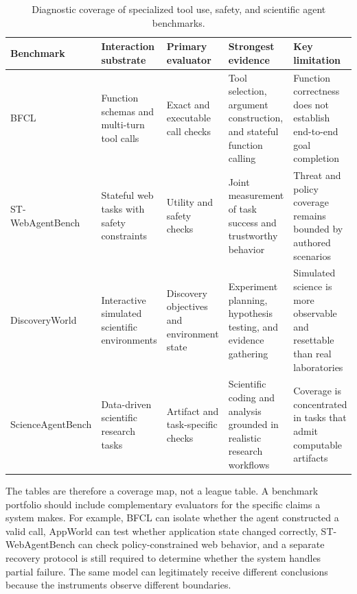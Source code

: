 \begin{table}[!htbp]
\centering
\caption{Diagnostic coverage of specialized tool use, safety, and scientific agent benchmarks.}
\label{tab:benchmark-evidence-specialized}
\small
\surveytableformat
\begin{tabularx}{\textwidth}{L{2.65cm}L{3.05cm}L{3.1cm}L{3.4cm}Y}
\toprule
{}\textbf{Benchmark} & \textbf{Interaction substrate} & \textbf{Primary evaluator} & \textbf{Strongest evidence} & \textbf{Key limitation} \\
\midrule
BFCL~\cite{patil2025bfcl} & Function schemas and multi-turn tool calls & Exact and executable call checks & Tool selection, argument construction, and stateful function calling & Function correctness does not establish end-to-end goal completion \\
ST-WebAgent\-Bench\newline\cite{levy2026stwebagentbench} & Stateful web tasks with safety constraints & Utility and safety checks & Joint measurement of task success and trustworthy behavior & Threat and policy coverage remains bounded by authored scenarios \\
Discovery\-World\newline\cite{jansen2024discoveryworld} & Interactive simulated scientific environments & Discovery objectives and environment state & Experiment planning, hypothesis testing, and evidence gathering & Simulated science is more observable and resettable than real laboratories \\
ScienceAgent\-Bench\newline\cite{chen2025scienceagentbench} & Data-driven scientific research tasks & Artifact and task-specific checks & Scientific coding and analysis grounded in realistic research workflows & Coverage is concentrated in tasks that admit computable artifacts \\
\bottomrule
\end{tabularx}
\end{table}

The tables are therefore a coverage map, not a league table. A benchmark portfolio should include complementary evaluators for the specific claims a system makes. For example, BFCL can isolate whether the agent constructed a valid call, AppWorld can test whether application state changed correctly, ST-WebAgentBench can check policy-constrained web behavior, and a separate recovery protocol is still required to determine whether the system handles partial failure. The same model can legitimately receive different conclusions because the instruments observe different boundaries.

